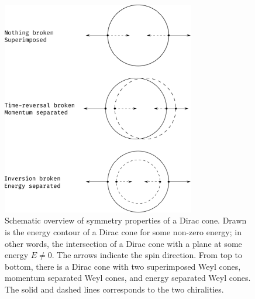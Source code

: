 \begin{figure}[p]
  \centering
  \includegraphics[width=0.75\textwidth]{figures/spinStructureWeyl}
  \caption{\label{fig:spinStructure}%
    Schematic overview of symmetry properties of a Dirac cone.
    Drawn is the energy contour of a Dirac cone for some non-zero energy;
    in other words, the intersection of a Dirac cone with a plane at some energy \( E \neq 0 \).
    The arrows indicate the spin direction.
    From top to bottom, there is a Dirac cone with two superimposed Weyl cones, momentum separated Weyl cones, and energy separated Weyl cones.
    The solid and dashed lines corresponds to the two chiralities.
  }
\end{figure}
